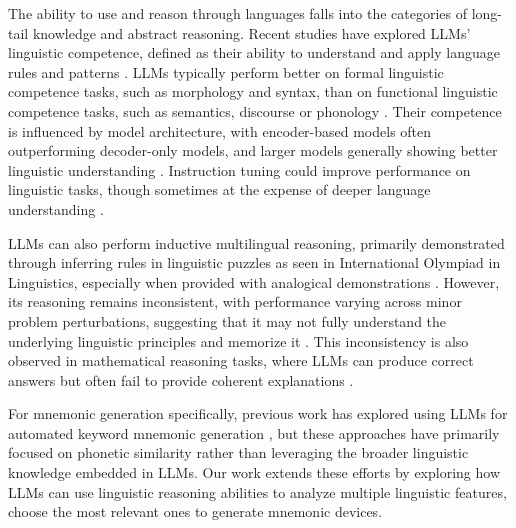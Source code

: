 The ability to use and reason through languages falls into the categories of long-tail knowledge and abstract reasoning. Recent studies have explored LLMs' linguistic competence, defined as their ability to understand and apply language rules and patterns \citep{waldisHOLMES2024}. LLMs typically perform better on formal linguistic competence tasks, such as morphology and syntax, than on functional linguistic competence tasks, such as semantics, discourse \citep{KhoujaLINGOLYTOO2025} or phonology \citep{suvarnaPhonologyBenchEvaluatingPhonological2024}. Their competence is influenced by model architecture, with encoder-based models often outperforming decoder-only models, and larger models generally showing better linguistic understanding \citep{waldisHOLMES2024}. Instruction tuning could improve performance on linguistic tasks, though sometimes at the expense of deeper language understanding \citep{waldisHOLMES2024,yinDidYouRead2023}.

LLMs can also perform inductive multilingual reasoning, primarily demonstrated through inferring rules in linguistic puzzles as seen in International Olympiad in Linguistics, especially when provided with analogical demonstrations \citep{RamjiINDUCTIVE2024}. However, its reasoning remains inconsistent, with performance varying across minor problem perturbations, suggesting that it may not fully understand the underlying linguistic principles and memorize it \citep{RamjiINDUCTIVE2024,KhoujaLINGOLYTOO2025}. This inconsistency is also observed in mathematical reasoning tasks, where LLMs can produce correct answers but often fail to provide coherent explanations \citep{weiChainofThoughtPromptingElicits2022}.

For mnemonic generation specifically, previous work has explored using LLMs for automated keyword mnemonic generation \citep{savvaTransPhonerAutomatedMnemonic2014,OzbalAUTOMATION2014,LeeSMARTPHONE2023,LeeEXPLORING2024,BalepurSMART2024}, but these approaches have primarily focused on phonetic similarity rather than leveraging the broader linguistic knowledge embedded in LLMs. Our work extends these efforts by exploring how LLMs can use linguistic reasoning abilities to analyze multiple linguistic features, choose the most relevant ones to generate mnemonic devices.
